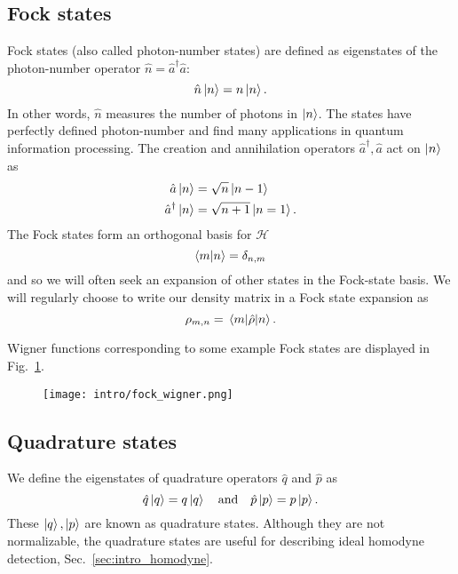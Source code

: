 \subsection{Fock states}
Fock states (also called photon-number states) are defined as eigenstates of the photon-number operator $\hat{n} = \hat{a}^\dagger \hat{a}$:
\begin{equation}
\hat{n} \ket{n} = n \ket{n}.
\end{equation}
In other words, $\hat{n}$ measures the number of photons in $\ket{n}$. The states have perfectly defined photon-number and find many applications in quantum information processing. The creation and annihilation operators $\hat{a}^\dagger, \hat{a}$ act on $\ket{n}$ as 
\begin{align*}
\hat{a}\ket{n} &= \sqrt{n}\ket{n-1} \\
\hat{a}^\dagger \ket{n} &= \sqrt{n+1} \ket{n=1}.
\end{align*}
The Fock states form an orthogonal basis for $\mathcal{H}$
\begin{equation}
\ip{m}{n} = \delta_{n, m}
\end{equation}
and so we will often seek an expansion of other states in the Fock-state basis. We will regularly choose to write our density matrix in a Fock state expansion as
\begin{equation}
\rho_{m, n} = \mel{m}{\hat{\rho}}{n}.
\end{equation}

\noindent Wigner functions corresponding to some example Fock states are displayed in Fig.~\ref{fig:intro_fock_wigner}.


\begin{figure}[htp]
\centering
\texttt{[image: intro/fock\_wigner.png]}
\caption{\label{fig:intro_fock_wigner}}
\end{figure}



\FloatBarrier
\subsection{Quadrature states}
We define the eigenstates of quadrature operators $\hat{q}$ and $\hat{p}$ as
\begin{equation}\label{eqn:intro_quadrature_state}
\hat{q}\ket{q} = q \ket{q} \qq{and} \hat{p}\ket{p} = p \ket{p}.
\end{equation}
These $\ket{q}, \ket{p}$ are known as quadrature states. Although they are not normalizable, the quadrature states are useful for describing ideal homodyne detection, Sec.~\ref{sec:intro_homodyne}. %



